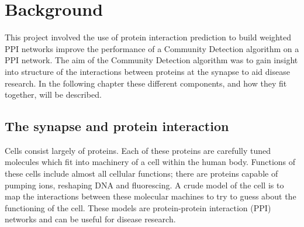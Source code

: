 \chapter{Background}
\label{background}

This project involved the use of protein interaction prediction to build weighted PPI networks improve the performance of a Community Detection algorithm on a PPI network.
The aim of the Community Detection algorithm was to gain insight into structure of the interactions between proteins at the synapse to aid disease research.
In the following chapter these different components, and how they fit together, will be described.

\section{The synapse and protein interaction}

Cells consist largely of proteins. 
Each of these proteins are carefully tuned molecules which fit into machinery of a cell within the human body. %
Functions of these cells include almost all cellular functions; there are proteins capable of pumping ions, reshaping DNA and fluorescing\autocite{alberts_molecular_2008}. %
A crude model of the cell is to map the interactions between these molecular machines to try to guess about the functioning of the cell. %
These models are protein-protein interaction (PPI) networks and can be useful for disease research. %

